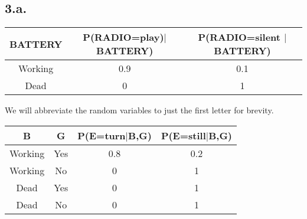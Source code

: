 \documentclass{article}
\begin{document}
\subsection*{3.a.}
\begin{center}
    \begin{tabular}{|c|c|c|}
        \hline
        \textbf{BATTERY} & \textbf{P(RADIO=play)$|$BATTERY)} & \textbf{P(RADIO=silent $|$ BATTERY)} \\
        \hline
        Working          & 0.9                               & 0.1                                  \\
        \hline
        Dead             & 0                                 & 1                                    \\
        \hline
    \end{tabular}
\end{center}

We will abbreviate the random variables to just the first letter for brevity.
\begin{center}
    \begin{tabular}{|c|c|c|c|}
        \hline
        {\textbf B} & {\textbf G} & {\textbf P(E=turn$|$B,G)} & {\textbf P(E=still$|$B,G)} \\
        \hline
        Working     & Yes         & 0.8                       & 0.2                        \\
        \hline
        Working     & No          & 0                         & 1                          \\
        \hline
        Dead        & Yes         & 0                         & 1                          \\
        \hline
        Dead        & No          & 0                         & 1                          \\
        \hline
    \end{tabular}
\end{center}
\end{document}
